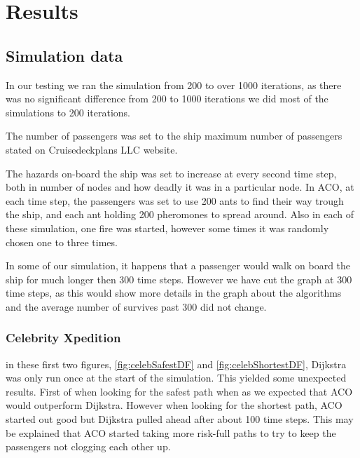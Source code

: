 \chapter{Results}
\label{ch:testing}

\section{Simulation data}
In our testing we ran the simulation from 200 to over 1000 iterations, as there was no significant difference from 200 to 1000 iterations we did most of the simulations to 200 iterations.

The number of passengers was set to the ship maximum number of passengers stated on Cruisedeckplans LLC\cite{cruseships} website.

The hazards on-board the ship was set to increase at every second time step, both in number of nodes and how deadly it was in a particular node. In ACO, at each time step, the passengers was set to use 200 ants to find their way trough the ship, and each ant holding 200 pheromones to spread around. Also in each of these simulation, one fire was started, however some times it was randomly chosen one to three times.

In some of our simulation, it happens that a passenger would walk on board the ship for much longer then 300 time steps. However we have cut the graph at 300 time steps, as this would show more details in the graph about the algorithms and the average number of survives past 300 did not change.


\subsection{Celebrity Xpedition}


in these first two figures, \ref{fig:celebSafestDF} and \ref{fig:celebShortestDF}, Dijkstra was only run once at the start of the simulation. This yielded some unexpected results. First of when looking for the safest path when as we expected that ACO would outperform Dijkstra. However when looking for the shortest path, ACO started out good but Dijkstra pulled ahead after about 100 time steps. This may be explained that ACO started taking more risk-full paths to try to keep the passengers not clogging each other up.


